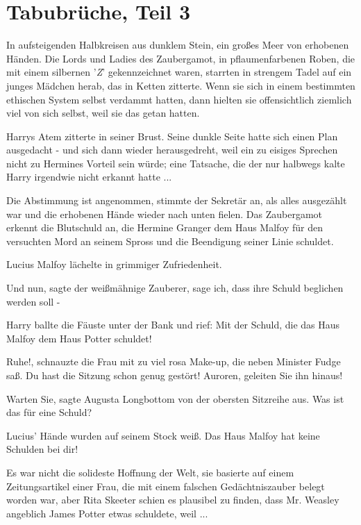 \chapter{Tabubrüche, Teil 3}

In aufsteigenden Halbkreisen aus dunklem Stein, ein großes Meer von erhobenen
Händen. Die Lords und Ladies des Zaubergamot, in pflaumenfarbenen Roben, die mit
einem silbernen '\emph{Z}' gekennzeichnet waren, starrten in strengem Tadel auf
ein junges Mädchen herab, das in Ketten zitterte. Wenn sie sich in einem
bestimmten ethischen System selbst verdammt hatten, dann hielten sie
offensichtlich ziemlich viel von sich selbst, weil sie das getan hatten.

Harrys Atem zitterte in seiner Brust. Seine dunkle Seite hatte sich einen Plan
ausgedacht - und sich dann wieder herausgedreht, weil ein zu eisiges Sprechen
nicht zu Hermines Vorteil sein würde; eine Tatsache, die der nur halbwegs kalte
Harry irgendwie nicht erkannt hatte ...

\glqq{}Die Abstimmung ist angenommen\grqq{}, stimmte der Sekretär an, als alles
ausgezählt war und die erhobenen Hände wieder nach unten fielen. \glqq{}Das
Zaubergamot erkennt die Blutschuld an, die Hermine Granger dem Haus Malfoy für
den versuchten Mord an seinem Spross und die Beendigung seiner Linie
schuldet.\grqq{}

Lucius Malfoy lächelte in grimmiger Zufriedenheit.

\glqq{}Und nun\grqq{}, sagte der weißmähnige Zauberer, \glqq{}sage ich, dass ihre
Schuld beglichen werden soll -\grqq{}

Harry ballte die Fäuste unter der Bank und rief: \glqq{}Mit der Schuld, die das
Haus Malfoy dem Haus Potter schuldet!\grqq{}

\glqq{}Ruhe!\grqq{}, schnauzte die Frau mit zu viel rosa Make-up, die neben
Minister Fudge saß. \glqq{}Du hast die Sitzung schon genug gestört! Auroren,
geleiten Sie ihn hinaus!\grqq{}

\glqq{}Warten Sie\grqq{}, sagte Augusta Longbottom von der obersten Sitzreihe
aus. \glqq{}Was ist das für eine Schuld?\grqq{}

Lucius' Hände wurden auf seinem Stock weiß. \glqq{}Das Haus Malfoy hat keine
Schulden bei dir!\grqq{}

Es war nicht die solideste Hoffnung der Welt, sie basierte auf einem
Zeitungsartikel einer Frau, die mit einem falschen Gedächtniszauber belegt
worden war, aber Rita Skeeter schien es plausibel zu finden, dass Mr. Weasley
angeblich James Potter etwas schuldete, weil ...

